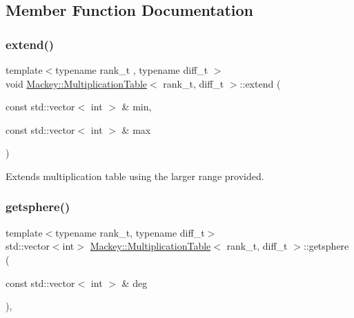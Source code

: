 \subsection{Member Function Documentation}
\mbox{\label{classMackey_1_1MultiplicationTable_a4371e6ba8a058073c005e636979b7230}} 
\subsubsection{\texorpdfstring{extend()}{extend()}}
{\footnotesize\ttfamily template$<$typename rank\+\_\+t , typename diff\+\_\+t $>$ \\
void \hyperlink{classMackey_1_1MultiplicationTable}{Mackey\+::\+Multiplication\+Table}$<$ rank\+\_\+t, diff\+\_\+t $>$\+::extend (\begin{DoxyParamCaption}\item[{const std\+::vector$<$ int $>$ \&}]{min,  }\item[{const std\+::vector$<$ int $>$ \&}]{max }\end{DoxyParamCaption})}



Extends multiplication table using the larger range provided. 

\mbox{\label{classMackey_1_1MultiplicationTable_ad4245f4a8122f0661f969498ef53f999}} 
\subsubsection{\texorpdfstring{getsphere()}{getsphere()}}
{\footnotesize\ttfamily template$<$typename rank\+\_\+t, typename diff\+\_\+t$>$ \\
std\+::vector$<$int$>$ \hyperlink{classMackey_1_1MultiplicationTable}{Mackey\+::\+Multiplication\+Table}$<$ rank\+\_\+t, diff\+\_\+t $>$\+::getsphere (\begin{DoxyParamCaption}\item[{const std\+::vector$<$ int $>$ \&}]{deg }\end{DoxyParamCaption})\hspace{0.3cm}{\ttfamily [inline]}, {\ttfamily [protected]}}



